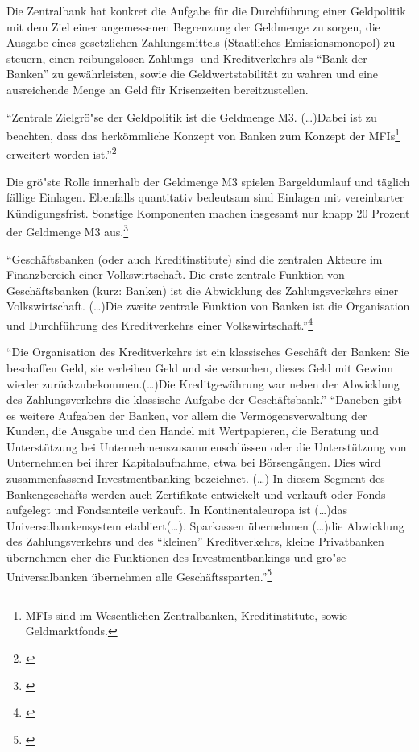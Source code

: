 \documentclass[
        onecolumn,
        a4paper,
        abstracton,
        parskip=half
        ,final
        ]{scrartcl}
\begin{document}
Die Zentralbank hat konkret die Aufgabe f{\"u}r die Durchf{\"u}hrung einer Geldpolitik mit dem Ziel einer angemessenen Begrenzung der Geldmenge zu sorgen, die Ausgabe eines gesetzlichen Zahlungsmittels (Staatliches Emissionsmonopol) zu steuern, einen reibungslosen Zahlungs- und Kreditverkehrs als "`Bank der Banken"' zu gew{\"a}hrleisten, sowie die Geldwertstabilit{\"a}t zu wahren und eine ausreichende Menge an Geld f{\"u}r Krisenzeiten bereitzustellen.

"`Zentrale Zielgr{\"o}{"s}e der Geldpolitik ist die Geldmenge M3. (\ldots)Dabei ist zu beachten, dass das herk{\"o}mmliche Konzept von Banken zum Konzept der \ac{MFIs}\footnote[23]{MFIs sind im Wesentlichen Zentralbanken, Kreditinstitute, sowie Geldmarktfonds.\citep*[S.508]{Basseler2010}} erweitert worden ist."'\footnote[24]{\citep*[S. 507]{Basseler2010}}

Die gr{\"o}{"s}te Rolle innerhalb der Geldmenge M3 spielen Bargeldumlauf und t{\"a}glich f{\"a}llige Einlagen. Ebenfalls quantitativ bedeutsam sind Einlagen mit vereinbarter K{\"u}ndigungsfrist. Sonstige Komponenten machen insgesamt nur knapp 20 Prozent der Geldmenge M3 aus.\footnote[25]{\citep*[S.508]{Basseler2010}}

"`Gesch{\"a}ftsbanken (oder auch Kreditinstitute) sind die zentralen Akteure im Finanzbereich einer Volkswirtschaft. Die erste zentrale Funktion von Gesch{\"a}ftsbanken (kurz: Banken) ist die Abwicklung des Zahlungsverkehrs einer Volkswirtschaft. (\ldots)Die zweite zentrale Funktion von Banken ist die Organisation und Durchf{\"u}hrung des Kreditverkehrs einer Volkswirtschaft."'\footnote[26]{\citep*[vgl.][S.512-13]{Basseler2010}}

"`Die Organisation des Kreditverkehrs ist ein klassisches Gesch{\"a}ft der Banken: Sie beschaffen Geld, sie verleihen Geld und sie versuchen, dieses Geld mit Gewinn wieder zur{\"u}ckzubekommen.(\ldots)Die Kreditgew{\"a}hrung war neben der Abwicklung des Zahlungsverkehrs die klassische Aufgabe der Gesch{\"a}ftsbank."'
 "`Daneben gibt es weitere Aufgaben der Banken, vor allem die Verm{\"o}gensverwaltung der Kunden, die Ausgabe und den Handel mit Wertpapieren, die Beratung und Unterst{\"u}tzung bei Unternehmenszusammenschl{\"u}ssen oder die Unterst{\"u}tzung von Unternehmen bei ihrer Kapitalaufnahme, etwa bei B{\"o}rseng{\"a}ngen. Dies wird zusammenfassend Investmentbanking bezeichnet. (\ldots) In diesem Segment des Bankengesch{\"a}fts  werden auch Zertifikate entwickelt und verkauft oder Fonds aufgelegt und Fondsanteile verkauft. In Kontinentaleuropa ist (\ldots)das Universalbankensystem etabliert(\ldots). Sparkassen {\"u}bernehmen (\ldots)die Abwicklung des Zahlungsverkehrs und des "`kleinen"' Kreditverkehrs, kleine Privatbanken {\"u}bernehmen eher die Funktionen des Investmentbankings und gro{"s}e Universalbanken {\"u}bernehmen alle Gesch{\"a}ftssparten."'\footnote[27]{\citep*[vgl.][S.512-13]{Basseler2010}}
\end{document}
